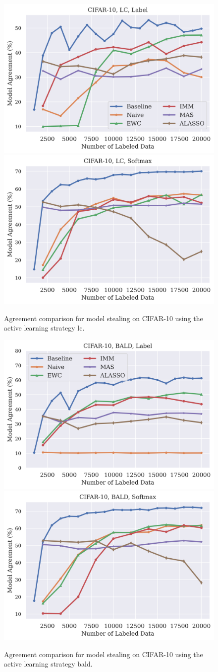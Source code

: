 \begin{figure}[!htb]
    \centering
    \includegraphics[width=0.48\linewidth]{images/results_CALMS/cifar_label_lc.png} \hfill
    \includegraphics[width=0.48\linewidth]{images/results_CALMS/cifar_softmax_lc.png}
    \caption{Agreement comparison for model stealing on CIFAR-10 using the active learning strategy \gls{lc}.}
    \label{fig:CALMSCIFAR10LC}
\end{figure}

\begin{figure}[!htb]
    \centering
    \includegraphics[width=0.48\linewidth]{images/results_CALMS/cifar_label_bald.png} \hfill
    \includegraphics[width=0.48\linewidth]{images/results_CALMS/cifar_softmax_bald.png}
    \caption{Agreement comparison for model stealing on CIFAR-10 using the active learning strategy \gls{bald}.}
    \label{fig:CALMSCIFAR10BALD}
\end{figure}

